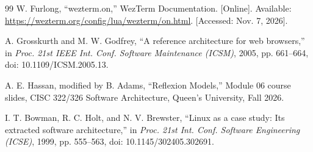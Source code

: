 \begin{thebibliography}{99}
W. Furlong, ``wezterm.on,'' WezTerm Documentation.
[Online]. Available: \url{https://wezterm.org/config/lua/wezterm/on.html}.
[Accessed: Nov. 7, 2026].

A. Grosskurth and M. W. Godfrey, ``A reference architecture for web browsers,'' in \emph{Proc. 21st IEEE Int. Conf. Software Maintenance (ICSM)}, 2005, pp. 661--664, doi: 10.1109/ICSM.2005.13.

A. E. Hassan, modified by B. Adams, ``Reflexion Models,'' Module 06 course slides, CISC 322/326 Software Architecture, Queen's University, Fall 2026.

I. T. Bowman, R. C. Holt, and N. V. Brewster, ``Linux as a case study: Its extracted software architecture,'' in \emph{Proc. 21st Int. Conf. Software Engineering (ICSE)}, 1999, pp. 555--563, doi: 10.1145/302405.302691.

\end{thebibliography}